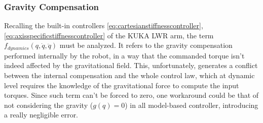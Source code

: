 \subsubsection{Gravity Compensation}
Recalling the built-in controllers \eqref{eq:cartesianstiffnesscontroller},\eqref{eq:axisspecificstiffnesscontroller} of the KUKA LWR arm, the term $f_{dynamics}(q,\dot{q},\ddot{q})$ must be analyzed. It refers to the gravity compensation performed internally by the robot, in a way that the commanded torque isn't indeed affected by the gravitational field. This, unfortunately, generates a conflict between the internal compensation and the whole control law, which at dynamic level requires the knowledge of the gravitational force to compute the input torques. Since such term can't be forced to zero, one workaround could be that of not considering the gravity ($g(q)=0$) in all model-based controller, introducing a really negligible error.
\newpage